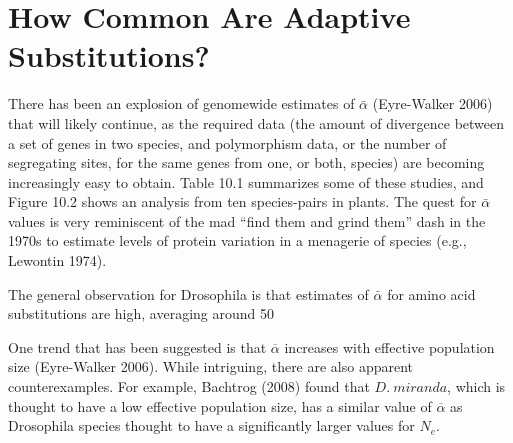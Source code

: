 \documentclass{article}
\begin{document}
\section{How Common Are Adaptive Substitutions?}
There has been an explosion of genomewide estimates of  $ \bar{\alpha} $ (Eyre-Walker 2006) that will likely continue, as the required data (the amount of divergence between a set of genes in two species, and polymorphism data, or the number of segregating sites, for the same genes from one, or both, species) are becoming increasingly easy to obtain. Table 10.1 summarizes some of these studies, and Figure 10.2 shows an analysis from ten species-pairs in plants. The quest for  $ \bar{\alpha} $ values is very reminiscent of the mad “find them and grind them” dash in the 1970s to estimate levels of protein variation in a menagerie of species (e.g., Lewontin 1974).

The general observation for Drosophila is that estimates of  $ \bar{\alpha} $ for amino acid substitutions are high, averaging around 50%

One trend that has been suggested is that  $ \overline{\alpha} $ increases with effective population size (Eyre-Walker 2006). While intriguing, there are also apparent counterexamples. For example, Bachtrog (2008) found that  $ D.\ miranda $, which is thought to have a low effective population size, has a similar value of  $ \overline{\alpha} $ as Drosophila species thought to have a significantly larger values for  $ N_{e} $.
\end{document}
